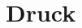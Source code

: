 \documentclass{beamer}
\begin{document}
\begin{frame}
\begin{columns}[c]
\begin{column}{4cm}
\end{column}
\end{columns}



 \end{frame}


\section{Druck}





\begin{frame}
\end{frame}
\end{document}
